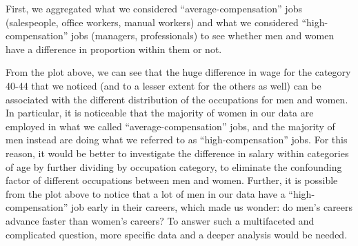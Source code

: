 \documentclass[
  letterpaper,
  DIV=11,
  numbers=noendperiod]{scrartcl}
\newenvironment{Shaded}{\begin{snugshade}}{\end{snugshade}}
\newcommand{\AttributeTok}[1]{\textcolor[rgb]{0.40,0.45,0.13}{#1}}
\newcommand{\CommentTok}[1]{\textcolor[rgb]{0.37,0.37,0.37}{#1}}
\newcommand{\DecValTok}[1]{\textcolor[rgb]{0.68,0.00,0.00}{#1}}
\newcommand{\FloatTok}[1]{\textcolor[rgb]{0.68,0.00,0.00}{#1}}
\newcommand{\FunctionTok}[1]{\textcolor[rgb]{0.28,0.35,0.67}{#1}}
\newcommand{\NormalTok}[1]{\textcolor[rgb]{0.00,0.23,0.31}{#1}}
\newcommand{\SpecialCharTok}[1]{\textcolor[rgb]{0.37,0.37,0.37}{#1}}
\newcommand{\StringTok}[1]{\textcolor[rgb]{0.13,0.47,0.30}{#1}}
\begin{document}
First, we aggregated what we considered ``average-compensation'' jobs
(salespeople, office workers, manual workers) and what we considered
``high-compensation'' jobs (managers, professionals) to see whether men
and women have a difference in proportion within them or not.

From the plot above, we can see that the huge difference in wage for the
category 40-44 that we noticed (and to a lesser extent for the others as
well) can be associated with the different distribution of the
occupations for men and women. In particular, it is noticeable that the
majority of women in our data are employed in what we called
``average-compensation'' jobs, and the majority of men instead are doing
what we referred to as ``high-compensation'' jobs. For this reason, it
would be better to investigate the difference in salary within
categories of age by further dividing by occupation category, to
eliminate the confounding factor of different occupations between men
and women. Further, it is possible from the plot above to notice that a
lot of men in our data have a ``high-compensation'' job early in their
careers, which made us wonder: do men's careers advance faster than
women's careers? To answer such a multifaceted and complicated question,
more specific data and a deeper analysis would be needed.

\begin{Shaded}
\end{Shaded}
\end{document}
